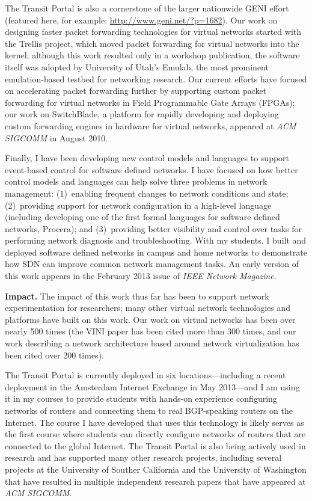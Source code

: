 The Transit Portal is also a cornerstone of the larger nationwide GENI effort
(featured here, for example: \url{http://www.geni.net/?p=1682}).  Our
work on designing faster packet forwarding technologies for virtual
networks started with the Trellis project, which moved packet forwarding
for virtual networks into the kernel; although this work resulted only
in a workshop publication, the software itself was adopted by University
of Utah's Emulab, the most prominent emulation-based testbed for
networking research.  Our current efforts have focused on accelerating
packet forwarding further by supporting custom packet forwarding for
virtual networks in Field Programmable Gate Arrays (FPGAs); our work on
SwitchBlade, a platform for rapidly developing and deploying custom
forwarding engines in hardware for virtual networks, appeared at {\em
ACM SIGCOMM} in August 2010.

Finally, I have been developing new control models and languages to
support event-based control for software defined networks.  I have
focused on how better control models and languages can help solve three
problems in network management: (1)~enabling frequent changes to network
conditions and state; (2)~providing support for network configuration in
a high-level language (including developing one of the first formal
languages for software defined networks, Procera); and (3)~providing
better visibility and control over tasks for performing network
diagnosis and troubleshooting.  With my students, I built and deployed
software defined networks in campus and home networks to demonstrate how
SDN can improve common network management tasks.  An early version of
this work appears in the February 2013 issue of {\em IEEE Network
Magazine}.

{\bf Impact.}  The impact of this work thus far has been to support
network experimentation for researchers; many other virtual network
technologies and platforms have built on this work. Our work on virtual
networks has been over nearly 500 times (the VINI paper has been cited
more than 300 times, and our work describing a network architecture
based around network virtualization has been cited over 200 times).

The Transit Portal is currently deployed in six locations---including a
recent deployment in the Amsterdam Internet Exchange in May 2013---and I
am using it in my courses to provide students with hands-on experience
configuring networks of routers and connecting them to real BGP-speaking
routers on the Internet.  The course I have developed that uses this
technology is likely serves as the first course where students can
directly configure networks of routers that are connected to the global
Internet.  The Transit Portal is also being actively used in research
and has supported many other research projects, including several
projects at the University of Souther California and the University of
Washington that have resulted in multiple independent research papers
that have appeared at {\em ACM SIGCOMM}.

